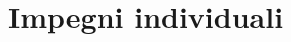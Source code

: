 \section{Impegni individuali}\label{section:Impegni_individuali}
\begin{comment}

\subsection{Informazioni generali}
	\begin {itemize}
		\item \textbf{Nome:} \textit{CC4D};
		\item \textbf{Proponente:} \textit{San Marco Informatica S.p.A.};
		\item \textbf{Committente:} \textit{Prof. Tullio Vardanega e Prof. Riccardo Cardin}.
	\end{itemize}

\subsection{Descrizione del capitolato}
	Il controllo statistico consente di contenere l'esito di un processo all'interno di specifici limiti, determinati attraverso lo studio della variazione naturale dei limiti del processo.\\
	Uno degli strumenti utilizzati a tale scopo sono le carte di controllo, le quali permettono di identificare visivamente tramite grafici tali variazioni.\\
	Questi controlli verranno effettuati su diverse misurazioni di pezzi prodotti da determinate macchine produttive.

\subsection{Finalità del progetto}
	Il capitolato richiede la creazione di:
	\begin{itemize}
		\item \textbf{Console Amministrativa}: WEBAPP per il censimento delle macchine produttive e le relative caratteristiche le quali determineranno la regolarità delle misurazioni ricevute;
		\item \textbf{API Raccolta Dati}: API per l'immisione delle misurazioni di una determinata caratteristica e salvataggio in un time series database\glo;
		\item \textbf{Motore di Calcolo}: responsabile della valutazione della conformità delle nuove misurazioni ed eventuale ricalcolo dei limiti sulla base delle ultime N rilevazioni;
		\item \textbf{Visualizzazione Dati}: WEBAPP per la visualizzazione a rotazione delle molteplici carte di controllo.
	\end{itemize}


\end{comment}
